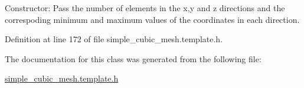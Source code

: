 Constructor\+: Pass the number of elements in the x,y and z directions and the correspoding minimum and maximum values of the coordinates in each direction. 



Definition at line 172 of file simple\+\_\+cubic\+\_\+mesh.\+template.\+h.



The documentation for this class was generated from the following file\+:\begin{DoxyCompactItemize}
\item 
\hyperlink{simple__cubic__mesh_8template_8h}{simple\+\_\+cubic\+\_\+mesh.\+template.\+h}\end{DoxyCompactItemize}
